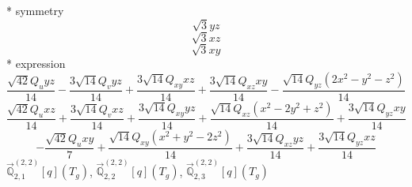 \documentclass[fleqn,8pt]{jsarticle}
\begin{document}
\noindent\quad ** symmetry
\begin{dmath*}
\sqrt{3} y z
\end{dmath*}
\begin{dmath*}
\sqrt{3} x z
\end{dmath*}
\begin{dmath*}
\sqrt{3} x y
\end{dmath*}
\noindent\quad ** expression
\begin{dmath*}
\frac{\sqrt{42} Q_{u} y z}{14} - \frac{3 \sqrt{14} Q_{v} y z}{14} + \frac{3 \sqrt{14} Q_{xy} x z}{14} + \frac{3 \sqrt{14} Q_{xz} x y}{14} - \frac{\sqrt{14} Q_{yz} \left(2 x^{2} - y^{2} - z^{2}\right)}{14}
\end{dmath*}
\begin{dmath*}
\frac{\sqrt{42} Q_{u} x z}{14} + \frac{3 \sqrt{14} Q_{v} x z}{14} + \frac{3 \sqrt{14} Q_{xy} y z}{14} + \frac{\sqrt{14} Q_{xz} \left(x^{2} - 2 y^{2} + z^{2}\right)}{14} + \frac{3 \sqrt{14} Q_{yz} x y}{14}
\end{dmath*}
\begin{dmath*}
- \frac{\sqrt{42} Q_{u} x y}{7} + \frac{\sqrt{14} Q_{xy} \left(x^{2} + y^{2} - 2 z^{2}\right)}{14} + \frac{3 \sqrt{14} Q_{xz} y z}{14} + \frac{3 \sqrt{14} Q_{yz} x z}{14}
\end{dmath*}
\noindent\quad $\vec{\mathbb{Q}}_{2,1}^{(2,2)}[q](T_{g})$, $\vec{\mathbb{Q}}_{2,2}^{(2,2)}[q](T_{g})$, $\vec{\mathbb{Q}}_{2,3}^{(2,2)}[q](T_{g})$
\end{document}
